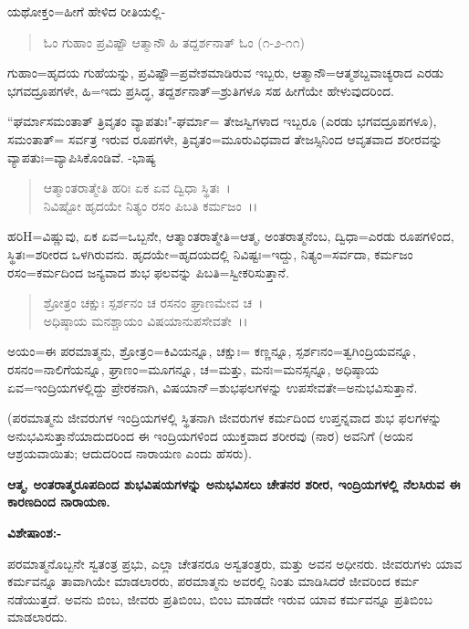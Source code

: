 ಯಥೋಕ್ತಂ=ಹೀಗೆ ಹೇಳಿದ ರೀತಿಯಲ್ಲಿ-

\begin{verse}
ಓಂ ಗುಹಾಂ ಪ್ರವಿಷ್ಟೌ ಆತ್ಮಾನೌ ಹಿ ತದ್ದರ್ಶನಾತ್ ಓಂ (೧-೨-೧೧)
\end{verse}

ಗುಹಾಂ=ಹೃದಯ ಗುಹೆಯನ್ನು, ಪ್ರವಿಷ್ಟೌ=ಪ್ರವೇಶಮಾಡಿರುವ ಇಬ್ಬರು, ಆತ್ಮಾನೌ=ಆತ್ಮಶಬ್ದವಾಚ್ಯರಾದ ಎರಡು ಭಗವದ್ರೂಪಗಳೇ, ಹಿ=ಇದು ಪ್ರಸಿದ್ಧ, ತದ್ದರ್ಶನಾತ್=ಶ್ರುತಿಗಳೂ ಸಹ ಹೀಗೆಯೇ ಹೇಳುವುದರಿಂದ.

``ಘರ್ಮಾಸಮಂತಾತ್ ತ್ರಿವೃತಂ ವ್ಯಾಪತುಃ"-ಘರ್ಮಾ= ತೇಜಸ್ವಿಗಳಾದ ಇಬ್ಬರೂ (ಎರಡು ಭಗವದ್ರೂಪಗಳೂ), ಸಮಂತಾತ್= ಸರ್ವತ್ರ ಇರುವ ರೂಪಗಳೇ, ತ್ರಿವೃತಂ=ಮೂರುವಿಧವಾದ ತೇಜಸ್ಸಿನಿಂದ ಆವೃತವಾದ ಶರೀರವನ್ನು ವ್ಯಾಪತುಃ=ವ್ಯಾಪಿಸಿಕೊಂಡಿವೆ. -ಭಾಷ್ಯ

\begin{verse}
ಆತ್ಮಾಂತರಾತ್ಮೇತಿ ಹರಿಃ ಏಕ ಏವ ದ್ವಿಧಾ ಸ್ಥಿತಃ~।\\ ನಿವಿಷ್ಟೋ ಹೃದಯೇ ನಿತ್ಯಂ ರಸಂ ಪಿಬತಿ ಕರ್ಮಜಂ~।।
\end{verse}


ಹರಿH=ವಿಷ್ಣುವು, ಏಕ ಏವ=ಒಬ್ಬನೇ, ಆತ್ಮಾಂತರಾತ್ಮೇತಿ=ಆತ್ಮ, ಅಂತರಾತ್ಮನೆಂಬ, ದ್ವಿಧಾ=ಎರಡು ರೂಪಗಳಿಂದ, ಸ್ಥಿತಃ=ಶರೀರದ ಒಳಗಿರುವನು. ಹೃದಯೇ=ಹೃದಯದಲ್ಲಿ ನಿವಿಷ್ಟಃ=ಇದ್ದು, ನಿತ್ಯಂ=ಸರ್ವದಾ, ಕರ್ಮಜಂ ರಸಂ=ಕರ್ಮದಿಂದ ಜನ್ಯವಾದ ಶುಭ ಫಲವನ್ನು ಪಿಬತಿ=ಸ್ವೀಕರಿಸುತ್ತಾನೆ.

\begin{verse}
ಶ್ರೋತ್ರಂ ಚಕ್ಷುಃ ಸ್ಪರ್ಶನಂ ಚ ರಸನಂ ಘ್ರಾಣಮೇವ ಚ~।\\ ಅಧಿಷ್ಠಾಯ ಮನಶ್ಚಾಯಂ ವಿಷಯಾನುಪಸೇವತೇ~।।
\end{verse}


ಅಯಂ=ಈ ಪರಮಾತ್ಮನು, ಶ್ರೋತ್ರ೦=ಕಿವಿಯನ್ನೂ, ಚಕ್ಷುಃ= ಕಣ್ಣನ್ನೂ, ಸ್ಪರ್ಶಃನಂ=ತ್ವಗಿಂದ್ರಿಯವನ್ನೂ, ರಸನಂ=ನಾಲಿಗೆಯನ್ನೂ, ಘ್ರಾಣಂ=ಮೂಗನ್ನೂ, ಚ=ಮತ್ತು, ಮನಃ=ಮನಸ್ಸನ್ನೂ, ಅಧಿಷ್ಠಾಯ ಏವ=ಇಂದ್ರಿಯಗಳಲ್ಲಿದ್ದು ಪ್ರೇರಕನಾಗಿ, ವಿಷಯಾನ್=ಶುಭಫಲಗಳನ್ನು ಉಪಸೇವತೇ=ಅನುಭವಿಸುತ್ತಾನೆ.

(ಪರಮಾತ್ಮನು ಜೀವರುಗಳ ಇಂದ್ರಿಯಗಳಲ್ಲಿ ಸ್ಥಿತನಾಗಿ ಜೀವರುಗಳ ಕರ್ಮದಿಂದ ಉಪ್ತನ್ನವಾದ ಶುಭ ಫಲಗಳನ್ನು ಅನುಭವಿಸುತ್ತಾನೆಯಾದುದರಿಂದ ಈ ಇಂದ್ರಿಯಗಳಿಂದ ಯುಕ್ತವಾದ ಶರೀರವು (ನಾರ) ಅವನಿಗೆ (ಅಯನ ಆಶ್ರಯವಾಯಿತು; ಆದುದರಿಂದ ನಾರಾಯಣ ಎಂದು ಹೆಸರು).

\begin{center}
\textbf{ಆತ್ಮ, ಅಂತರಾತ್ಮರೂಪದಿಂದ ಶುಭವಿಷಯಗಳನ್ನು ಅನುಭವಿಸಲು ಚೇತನರ ಶರೀರ, ಇಂದ್ರಿಯಗಳಲ್ಲಿ ನೆಲಸಿರುವ ಈ ಕಾರಣದಿಂದ ನಾರಾಯಣ.}
\end{center}

\noindent
\textbf{ವಿಶೇಷಾಂಶ:-}

ಪರಮಾತ್ಮನೊಬ್ಬನೇ ಸ್ವತಂತ್ರ ಪ್ರಭು, ಎಲ್ಲಾ ಚೇತನರೂ ಅಸ್ವತಂತ್ರರು, ಮತ್ತು ಅವನ ಅಧೀನರು. ಜೀವರುಗಳು ಯಾವ ಕರ್ಮವನ್ನೂ ತಾವಾಗಿಯೇ ಮಾಡಲಾರರು, ಪರಮಾತ್ಮನು ಅವರಲ್ಲಿ ನಿಂತು ಮಾಡಿಸಿದರೆ ಜೀವರಿಂದ ಕರ್ಮ ನಡೆಯುತ್ತದೆ. ಅವನು ಬಿಂಬ, ಜೀವರು ಪ್ರತಿಬಿಂಬ, ಬಿಂಬ ಮಾಡದೇ ಇರುವ ಯಾವ ಕರ್ಮವನ್ನೂ ಪ್ರತಿಬಿಂಬ ಮಾಡಲಾರದು.

